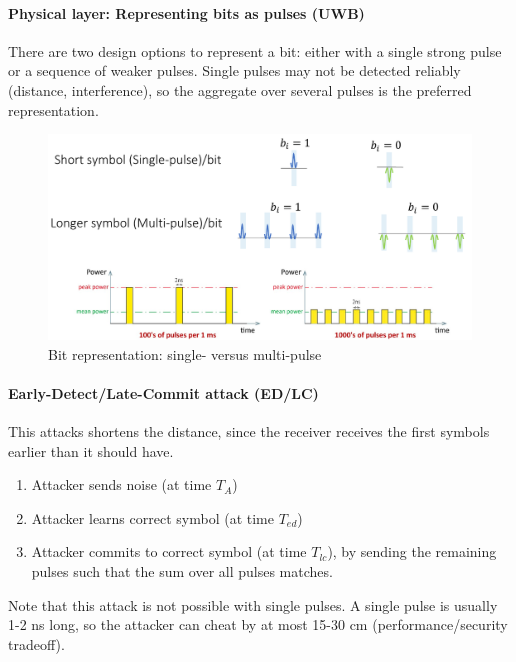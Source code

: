 \paragraph{Physical layer: Representing bits as pulses (UWB)}
There are two design options to represent a bit: either with a single strong pulse or a sequence of weaker pulses.
Single pulses may not be detected reliably (distance, interference), so the aggregate over several pulses is the preferred representation.

\begin{figure}
	\centering
	\includegraphics[scale=0.4]{images/5-single-multi-pulse.png}
	\caption{Bit representation: single- versus multi-pulse}
	\label{fig:single-multi-pulse}
\end{figure}

\paragraph{Early-Detect/Late-Commit attack (ED/LC)}
This attacks shortens the distance, since the receiver receives the first symbols earlier than it should have.

\begin{enumerate}
	\item Attacker sends noise (at time $T_A$)
	\item Attacker learns correct symbol (at time $T_{ed}$)
	\item Attacker commits to correct symbol (at time $T_{lc}$), by sending the remaining pulses such that the sum over all pulses matches.
\end{enumerate}

Note that this attack is not possible with single pulses.
A single pulse is usually 1-2 ns long, so the attacker can cheat by at most 15-30 cm (performance/security tradeoff).

